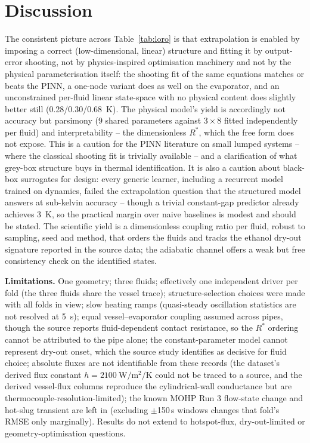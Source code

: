 \section{Discussion}
The consistent picture across Table~\ref{tab:loro} is that extrapolation is enabled by imposing a correct
(low-dimensional, linear) structure and fitting it by output-error shooting, not by physics-inspired optimisation
machinery and not by the physical parameterisation itself: the shooting fit of the same equations matches or beats
the PINN, a one-node variant does as well on the evaporator, and an unconstrained per-fluid linear state-space
with no physical content does slightly better still (0.28/0.30/\SI{0.68}{\kelvin}). The physical model's yield is
accordingly not accuracy but parsimony (9 shared parameters against $3{\times}8$ fitted independently per fluid)
and interpretability -- the dimensionless $R^*$, which the free form does not expose. This is a caution
for the PINN literature on small lumped systems -- where the classical shooting fit is trivially available -- and
a clarification of what grey-box structure buys in thermal identification. It is also a caution about black-box
surrogates for design: every generic learner, including a recurrent model trained on dynamics, failed the
extrapolation question that the structured model answers at sub-kelvin accuracy -- though a trivial constant-gap
predictor already achieves \SI{3}{\kelvin}, so the practical margin over naive baselines is modest and should be
stated. The scientific yield
is a dimensionless coupling ratio per fluid, robust to sampling, seed and method, that orders the fluids and tracks
the ethanol dry-out signature reported in the source data; the adiabatic channel offers a weak but free consistency
check on the identified states.

\textbf{Limitations.} One geometry; three fluids; effectively one independent driver per fold (the three fluids
share the vessel trace); structure-selection choices were made with all folds in view; slow heating ramps
(quasi-steady oscillation statistics are not resolved at \SI{5}{\second}); equal vessel--evaporator coupling
assumed across pipes, though the source reports fluid-dependent contact resistance, so the $R^*$ ordering cannot be
attributed to the pipe alone; the constant-parameter model cannot represent dry-out onset, which the source study
identifies as decisive for fluid choice; absolute fluxes are not identifiable from these records (the dataset's
derived flux constant $h=\SI{2100}{\watt\per\square\metre\per\kelvin}$ could not be traced to a source, and the
derived vessel-flux columns reproduce the cylindrical-wall conductance but are thermocouple-resolution-limited);
the known MOHP Run 3 flow-state change and hot-slug transient are left in (excluding $\pm$150\,s windows changes
that fold's RMSE only marginally). Results do not extend to hotspot-flux, dry-out-limited or geometry-optimisation
questions.
